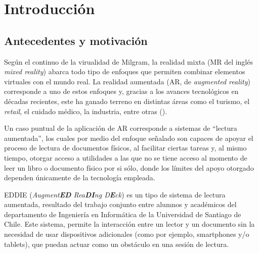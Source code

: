 \chapter{Introducci\'on}
\label{cap:introduccion}

\section{Antecedentes y motivación}
\label{intro:motivacion}
Según el continuo de la virualidad de Milgram, la realidad mixta (MR del inglés \textit{mixed reality}) abarca todo tipo de enfoques que permiten combinar elementos virtuales con el mundo real. La realidad aumentada (AR, de \textit{augmented reality}) corresponde a uno de estos enfoques y, gracias a los avances tecnológicos en décadas recientes, este ha ganado terreno en distintas áreas como el turismo, el \textit{retail}, el cuidado médico, la industria, entre otras (\cite{jung_dieck_2018}).

Un caso puntual de la aplicación de AR corresponde a sistemas de ``lectura aumentada'', los cuales por medio del enfoque señalado son capaces de apoyar el proceso de lectura de documentos físicos, al facilitar ciertas tareas y, al mismo tiempo, otorgar acceso a utilidades a las que no se tiene acceso al momento de leer un libro o documento físico por si sólo, donde los límites del apoyo otorgado dependen únicamente de la tecnología empleada. 

EDDIE (\textit{Augment\textbf{ED} Rea\textbf{DI}ng D\textbf{E}ck}) es un tipo de sistema de lectura aumentada, resultado del trabajo conjunto entre alumnos y académicos del departamento de Ingeniería en Informática de la Universidad de Santiago de Chile. Este sistema, permite la interacción entre un lector y un documento sin la necesidad de usar dispositivos adicionales (como por ejemplo, smartphones y/o tablets), que puedan actuar como un obstáculo en una sesión de lectura.



